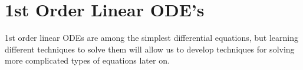 \chapter{1st Order Linear ODE's}
\noindent
1st order linear ODEs are among the simplest differential equations, but learning different techniques to solve them will allow us to develop techniques for solving more complicated types of equations later on.





